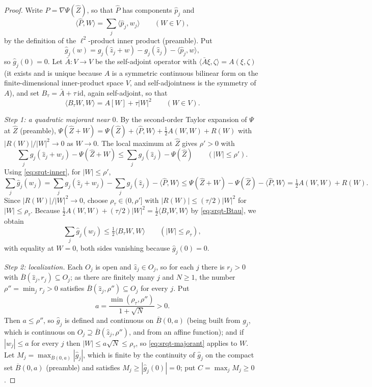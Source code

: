 \begin{proof}
Write $\widehat P=\nabla\Psi(\widehat Z)$, so that $\widehat P$ has components
$\widehat p_j$ and
\begin{equation}\label{eq:srqt-inner}
  \langle\widehat P,W\rangle=\sum_j\langle\widehat p_j,w_j\rangle\qquad(W\in V),
\end{equation}
by the definition of the $\ell^2$-product inner product (preamble). Put
\[
  \widehat g_j(w)=g_j(\widehat z_j+w)-g_j(\widehat z_j)
   -\langle\widehat p_j,w\rangle ,
\]
so $\widehat g_j(0)=0$. Let $\bar A:V\to V$ be the self-adjoint operator with
$\langle\bar A\xi,\zeta\rangle=A(\xi,\zeta)$ (it exists and is unique because
$A$ is a symmetric continuous bilinear form on the finite-dimensional
inner-product space $V$, and self-adjointness is the symmetry of $A$), and set
$B_\tau=\bar A+\tau\,\mathrm{id}$, again self-adjoint, so that
\begin{equation}\label{eq:srqt-Btau}
  \langle B_\tau W,W\rangle=A[W]+\tau|W|^2\qquad(W\in V).
\end{equation}

\emph{Step 1: a quadratic majorant near $0$.}
By the second-order Taylor expansion of $\Psi$ at $\widehat Z$ (preamble),
$\Psi(\widehat Z+W)=\Psi(\widehat Z)+\langle\widehat P,W\rangle
+\tfrac12A(W,W)+R(W)$ with $|R(W)|/|W|^2\to0$ as $W\to0$. The local maximum at
$\widehat Z$ gives $\rho'>0$ with
\[
  \sum_jg_j(\widehat z_j+w_j)-\Psi(\widehat Z+W)
   \le\sum_jg_j(\widehat z_j)-\Psi(\widehat Z)\qquad(|W|\le\rho').
\]
Using \eqref{eq:srqt-inner}, for $|W|\le\rho'$,
\[
  \sum_j\widehat g_j(w_j)
   =\sum_jg_j(\widehat z_j+w_j)-\sum_jg_j(\widehat z_j)
     -\langle\widehat P,W\rangle
   \le\Psi(\widehat Z+W)-\Psi(\widehat Z)-\langle\widehat P,W\rangle
   =\tfrac12A(W,W)+R(W).
\]
Since $|R(W)|/|W|^2\to0$, choose $\rho_\tau\in(0,\rho']$ with
$|R(W)|\le(\tau/2)|W|^2$ for $|W|\le\rho_\tau$. Because
$\tfrac12A(W,W)+(\tau/2)|W|^2=\tfrac12\langle B_\tau W,W\rangle$ by
\eqref{eq:srqt-Btau}, we obtain
\begin{equation}\label{eq:srqt-majorant}
  \sum_j\widehat g_j(w_j)\le\tfrac12\langle B_\tau W,W\rangle
  \qquad(|W|\le\rho_\tau),
\end{equation}
with equality at $W=0$, both sides vanishing because $\widehat g_j(0)=0$.

\emph{Step 2: localization.}
Each $O_j$ is open and $\widehat z_j\in O_j$, so for each $j$ there is
$r_j>0$ with $\overline B(\widehat z_j,r_j)\subseteq O_j$; as there are finitely
many $j$ and $N\ge1$, the number $\rho''=\min_jr_j>0$ satisfies
$\overline B(\widehat z_j,\rho'')\subseteq O_j$ for every $j$. Put
\[
  a=\frac{\min(\rho_\tau,\rho'')}{1+\sqrt N}>0 .
\]
Then $a\le\rho''$, so $\widehat g_j$ is defined and continuous on
$\overline B(0,a)$ (being built from $g_j$, which is continuous on $O_j\supseteq
\overline B(\widehat z_j,\rho'')$, and from an affine function); and if
$|w_j|\le a$ for every $j$ then $|W|\le a\sqrt N\le\rho_\tau$, so
\eqref{eq:srqt-majorant} applies to $W$. Let
$M_j=\max_{\overline B(0,a)}|\widehat g_j|$, which is finite by the continuity of
$\widehat g_j$ on the compact set $\overline B(0,a)$ (preamble) and satisfies
$M_j\ge|\widehat g_j(0)|=0$; put $C=\max_jM_j\ge0$.


\end{proof}
